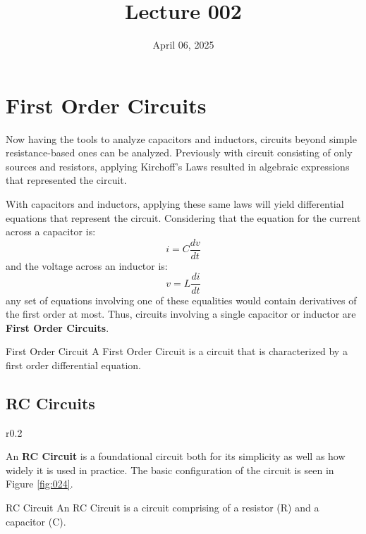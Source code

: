 \documentclass[12pt]{article}
\title{Lecture 002}
\date{April 06, 2025}
\begin{document}
\newpage
\section{First Order Circuits}
\label{sec:firstOrderCircuits}

Now having the tools to analyze capacitors and inductors, circuits beyond simple resistance-based ones can be analyzed. Previously with circuit consisting of only sources and resistors, applying Kirchoff's Laws resulted in algebraic expressions that represented the circuit.

With capacitors and inductors, applying these same laws will yield differential equations that represent the circuit. Considering that the equation for the current across a capacitor is:
\begin{equation*}
  i = C\frac{dv}{dt}
\end{equation*}
and the voltage across an inductor is:
\begin{equation*}
  v = L\frac{di}{dt}
\end{equation*}
any set of equations involving one of these equalities would contain derivatives of the first order at most. Thus, circuits involving a single capacitor or inductor are \textbf{First Order Circuits}.

\begin{definition}{First Order Circuit}
  A First Order Circuit is a circuit that is characterized by a first order differential equation.
\end{definition}

\subsection{RC Circuits}
\label{ssec:rcCircuits}

\begin{wrapfigure}[4]{r}{0.2\textwidth}
  \centering
  
  \caption{RC Circuit}
  \label{fig:024}
\end{wrapfigure}

An \textbf{RC Circuit} is a foundational circuit both for its simplicity as well as how widely it is used in practice. The basic configuration of the circuit is seen in Figure \ref{fig:024}.

\begin{definition}{RC Circuit}
  An RC Circuit is a circuit comprising of a resistor (R) and a capacitor (C).
\end{definition}
\end{document}
